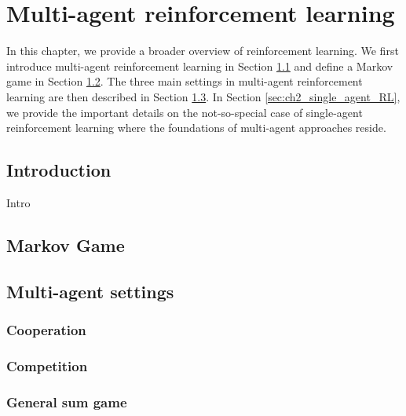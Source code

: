 \chapter{Multi-agent reinforcement learning} \label{ch:marl}

\begin{chapter_outline}

In this chapter, we provide a broader overview of reinforcement learning.
We first introduce multi-agent reinforcement learning in Section \ref{sec:ch2_Introduction} and define a Markov game in Section \ref{sec:ch2_Markov_Game}.
The three main settings in multi-agent reinforcement learning are then described in Section \ref{sec:ch2_multi_agent_settings}.
In Section \ref{sec:ch2_single_agent_RL}, we provide the important details on the not-so-special case of single-agent reinforcement learning where the foundations of multi-agent approaches reside.

\end{chapter_outline}

\section{Introduction} 
\label{sec:ch2_Introduction}
Intro

\section{Markov Game} 
\label{sec:ch2_Markov_Game}

\section{Multi-agent settings} 
\label{sec:ch2_multi_agent_settings}

\subsection{Cooperation} 
\label{sec:ch2_Cooperation}

\subsection{Competition} 
\label{sec:ch2_Competition}

\subsection{General sum game} 
\label{sec:ch2_general_sum_game}


